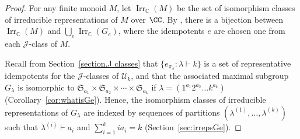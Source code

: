 \begin{proof}
    For any finite monoid $M$, let $\operatorname{Irr}_\mathbb{C}(M)$ be
    the set of isomorphism classes of irreducible representations of $M$ over $\CC$.
    By \cite[Corollary 5.6]{Steinberg.2016}, there is a bijection between
    $\operatorname{Irr}_\mathbb{C}(M)$
    and
    $\bigcup_{e} \operatorname{Irr}_\mathbb{C}(G_e)$,
    where the idempotents $e$ are chosen one from each $\mathscr{J}$-class of $M$.

    Recall from Section~\ref{section.J classes} that
    $\{e_{\pi_\lambda} : \lambda \vdash k\}$ is a set of representative
    idempotents for the $\mathscr{J}$-classes of $\mathcal{U}_k$,
    and that the associated maximal subgroup $G_\lambda$ is isomorphic to
    $\mathfrak{S}_{a_1} \times \mathfrak{S}_{a_2} \times \cdots \times \mathfrak{S}_{a_k}$
    if $\lambda = (1^{a_1}2^{a_2} \ldots k^{a_k})$ (Corollary~\ref{cor:whatisGe}).
    Hence, the isomorphism classes of irreducible representations of
    $G_\lambda$ are indexed by sequences of partitions $(\lambda^{(1)},
    \ldots, \lambda^{(k)})$ such that $\lambda^{(i)}\vdash a_i$
    and $\sum_{i=1}^k ia_i = k$ (\cf Section~\ref{sec:irrepsGe}).
\end{proof}

